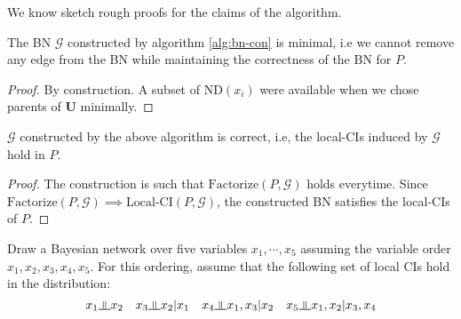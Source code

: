 We know sketch rough proofs for the claims of the algorithm.
\begin{thm}
The BN $\mathcal G$ constructed by algorithm \ref{alg:bn-con} is minimal, i.e we cannot remove any edge from the BN while maintaining the correctness of the BN for $P$.
\end{thm}
\begin{proof}
By construction. A subset of $\text{ND}(x_i)$ were available when we chose parents of $\mathbf U$ minimally.
\end{proof}
\begin{thm}
$\mathcal{G}$ constructed by the above algorithm is correct, i.e, the local-CIs induced by $\mathcal G$ hold in $P$.
\end{thm}
\begin{proof}
The construction is such that $\text{Factorize}(P, \mathcal G)$ holds everytime. Since $\text{Factorize}(P, \mathcal G) \implies \text{Local-CI}(P, \mathcal G)$, the constructed BN satisfies the local-CIs of $P$.
\end{proof}
\begin{quest}[Construction of BN]
Draw a Bayesian network over five variables $x_1,\cdots, x_5$ assuming the variable order $x_1, x_2, x_3, x_4, x_5$.
For this ordering, assume that the following set of local CIs hold in the distribution: 
\[x_1\ind x_2\quad x_3\ind x_2|x_1\quad x_4\ind x_1,x_3|x_2\quad x_5\ind x_1, x_2|x_3,x_4\]
\end{quest}
